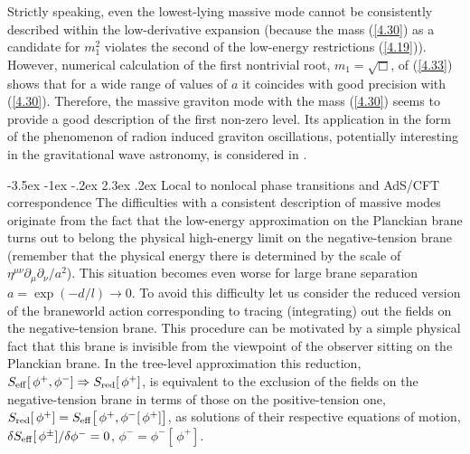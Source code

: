 \documentclass[a4paper,12pt]{article}
\makeatletter
\renewcommand\section{\@startsection {section}{1}{\z@}%
                                   {-3.5ex \@plus -1ex \@minus -.2ex}%
                                   {2.3ex \@plus.2ex}%
                                   {\normalfont\large\bfseries}}
\makeatother
\begin{document}
Strictly speaking, even the lowest-lying massive mode cannot be
consistently described within the low-derivative expansion (because
the mass (\ref{4.30}) as a candidate for $m_1^2$ violates the
second of the low-energy restrictions (\ref{4.19})). However,
numerical calculation of the first nontrivial root,
$m_1=\sqrt{\Box}$, of (\ref{4.33}) shows
that for a wide range of values of $a$ it coincides with good
precision with (\ref{4.30}). Therefore, the massive graviton
mode with the mass (\ref{4.30}) seems to provide a good description
of the first non-zero level. Its application in the form of the
phenomenon of radion induced graviton oscillations, potentially
interesting in the gravitational wave astronomy, is considered in
\cite{RIGO}.




\section{Local to nonlocal phase transitions and AdS/CFT
corre\-spondence} \label{sec:3}
The difficulties with a consistent description of massive modes
originate from the fact that the low-energy approximation on
the Planckian brane turns out to belong the physical high-energy
limit on the negative-tension brane (remember that the physical
energy there is determined by the scale of
$\eta^{\mu\nu}\partial_\mu\partial_\nu/a^2$). This situation becomes
even worse for large brane separation $a=\exp(-d/l)\to 0$. To avoid
this difficulty let us consider the reduced version of the braneworld
action corresponding to tracing (integrating) out the fields on the
negative-tension brane. This procedure can be motivated by a simple
physical fact that this brane is invisible from the viewpoint of the
observer sitting on the Planckian brane. In the tree-level
approximation this reduction, $S_{\rm eff}[\,\phi^+,\phi^-]
\Rightarrow S_{\rm red}[\,\phi^+]$, is equivalent to the exclusion of
the fields on the negative-tension brane in terms of those on the
positive-tension one, $S_{\rm red}[\,\phi^+]=
S_{\rm eff}\big[\,\phi^+,\phi^-[\,\phi^+]\big]$, as solutions
of their respective equations of motion,
$\delta S_{\rm eff}[\,\phi^\pm]/\delta\phi^-=0$,
$\phi^-=\phi^-[\,\phi^+]$.
\end{document}
